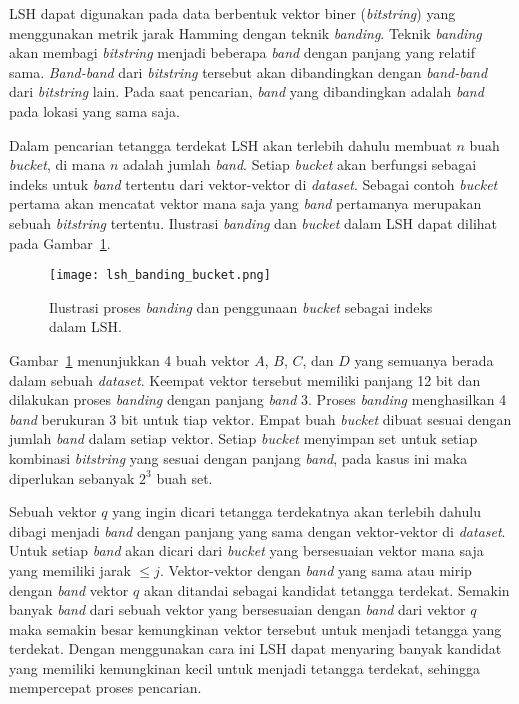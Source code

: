 LSH dapat digunakan pada data berbentuk vektor biner (\textit{bitstring}) yang menggunakan metrik jarak Hamming dengan teknik \textit{banding}. Teknik \textit{banding} akan membagi \textit{bitstring} menjadi beberapa \textit{band} dengan panjang yang relatif sama. \textit{Band-band} dari \textit{bitstring} tersebut akan dibandingkan dengan \textit{band-band} dari \textit{bitstring} lain. Pada saat pencarian, \textit{band} yang dibandingkan adalah \textit{band} pada lokasi yang sama saja. 

Dalam pencarian tetangga terdekat LSH akan terlebih dahulu membuat $n$ buah \textit{bucket}, di mana $n$ adalah jumlah \textit{band}. Setiap \textit{bucket} akan berfungsi sebagai indeks untuk \textit{band} tertentu dari vektor-vektor di \textit{dataset}. Sebagai contoh \textit{bucket} pertama akan mencatat vektor mana saja yang \textit{band} pertamanya merupakan sebuah \textit{bitstring} tertentu. Ilustrasi \textit{banding} dan \textit{bucket} dalam LSH dapat dilihat pada Gambar~\ref{fig:lsh_banding_bucket}. 

\begin{figure}
	\centering
	\texttt{[image: lsh\_banding\_bucket.png]}
	\caption{Ilustrasi proses \textit{banding} dan penggunaan \textit{bucket} sebagai indeks dalam LSH.}
	\label{fig:lsh_banding_bucket}
\end{figure}

Gambar~\ref{fig:lsh_banding_bucket} menunjukkan 4 buah vektor $A$, $B$, $C$, dan $D$ yang semuanya berada dalam sebuah \textit{dataset}. Keempat vektor tersebut memiliki panjang 12 bit dan dilakukan proses \textit{banding} dengan panjang \textit{band} 3. Proses \textit{banding} menghasilkan 4 \textit{band} berukuran 3 bit untuk tiap vektor. Empat buah \textit{bucket} dibuat sesuai dengan jumlah \textit{band} dalam setiap vektor. Setiap \textit{bucket} menyimpan set untuk setiap kombinasi \textit{bitstring} yang sesuai dengan panjang \textit{band}, pada kasus ini maka diperlukan sebanyak $2^{3}$ buah set. 

Sebuah vektor $q$ yang ingin dicari tetangga terdekatnya akan terlebih dahulu dibagi menjadi \textit{band} dengan panjang yang sama dengan vektor-vektor di \textit{dataset}. Untuk setiap \textit{band} akan dicari dari \textit{bucket} yang bersesuaian vektor mana saja yang memiliki jarak $\leq j$. Vektor-vektor dengan \textit{band} yang sama atau mirip dengan \textit{band} vektor $q$ akan ditandai sebagai kandidat tetangga terdekat. Semakin banyak \textit{band} dari sebuah vektor yang bersesuaian dengan \textit{band} dari vektor $q$ maka semakin besar kemungkinan vektor tersebut untuk menjadi tetangga yang terdekat. Dengan menggunakan cara ini LSH dapat menyaring banyak kandidat yang memiliki kemungkinan kecil untuk menjadi tetangga terdekat, sehingga mempercepat proses pencarian.

